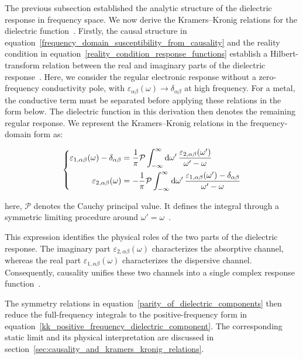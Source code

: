 The previous subsection established the analytic structure of the dielectric response in frequency space.
We now derive the Kramers--Kronig relations for the dielectric function~\cite{toll1956causality}.
Firstly, the causal structure in equation~\eqref{frequency_domain_susceptibility_from_causality} and the reality condition in equation~\eqref{reality_condition_response_functions}
establish a Hilbert-transform relation between the real and imaginary parts of the dielectric response~\cite{stefanski2022analytical,koutserimpas2024time,franta2020symmetry}.
Here, we consider the regular electronic response without a zero-frequency conductivity pole,
with $\varepsilon_{\alpha\beta}(\omega)\to\delta_{\alpha\beta}$ at high frequency.
For a metal, the conductive term must be separated before applying these relations in the form below.
The dielectric function in this derivation then denotes the remaining regular response.
We represent the Kramers--Kronig relations in the frequency-domain form as:

\begin{equation}
\left\{\begin{aligned}
    \varepsilon_{1,\alpha\beta}(\omega)-\delta_{\alpha\beta} &=
    \frac{1}{\mathrm{\pi}}\mathcal{P}
    \int_{-\infty}^{\infty}\mathrm{d}{\omega'}\,
    \frac{\varepsilon_{2,\alpha\beta}(\omega')}{\omega'-\omega} \\
\varepsilon_{2,\alpha\beta}(\omega) &=
    -\frac{1}{\mathrm{\pi}}\mathcal{P}
    \int_{-\infty}^{\infty}\mathrm{d}{\omega'}\,
    \frac{\varepsilon_{1,\alpha\beta}(\omega')-\delta_{\alpha\beta}}{\omega'-\omega}
\end{aligned}\right.
\label{kk_general_dielectric_tensor}
\end{equation}

here, $\mathcal{P}$ denotes the Cauchy principal value.
It defines the integral through a symmetric limiting procedure around $\omega'=\omega$~\cite{stefanski2022analytical,koutserimpas2024time}.

This expression identifies the physical roles of the two parts of the dielectric response.
The imaginary part $\varepsilon_{2,\alpha\beta}(\omega)$ characterizes the absorptive channel, 
whereas the real part $\varepsilon_{1,\alpha\beta}(\omega)$ characterizes the dispersive channel.
Consequently, causality unifies these two channels into a single complex response function~\cite{peiponen2009generalized}.

The symmetry relations in equation~\eqref{parity_of_dielectric_components} then reduce the full-frequency integrals to the positive-frequency form in equation~\eqref{kk_positive_frequency_dielectric_component}.
The corresponding static limit and its physical interpretation are discussed in section~\ref{sec:causality_and_kramers_kronig_relations}.
